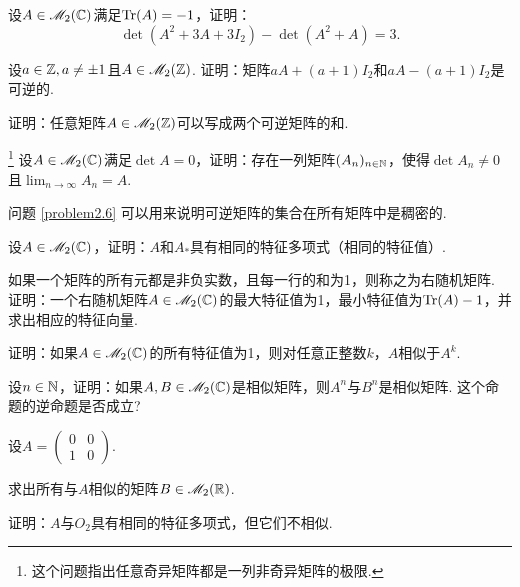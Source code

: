 \begin{problem}
  设$A\in\mathscr M_2(\mathbb C)$满足$\operatorname{Tr}(A)=-1$，证明：
  \[
    \det (A^2 + 3A + 3I_2) - \det (A^2 + A) = 3.
  \]
\end{problem}

\begin{problem}
  设$a\in\mathbb Z,a\ne\pm1$且$A\in\mathscr M_2(\mathbb Z)$. 证明：矩阵$aA+(a+1)I_2$和$aA-(a+1)I_2$是可逆的.
\end{problem}

\begin{problem}
  证明：任意矩阵$A\in\mathscr M_2(\mathbb Z)$可以写成两个可逆矩阵的和.
\end{problem}

\begin{problem}
  \footnote{这个问题指出任意奇异矩阵都是一列非奇异矩阵的极限.} 设$A\in\mathscr M_2(\mathbb C)$满足$\det A=0$，证明：存在一列矩阵$(A_n)_{n\in\mathbb N}$，使得$\det A_n\ne0$且$\lim_{n\to\infty}A_n=A$.
\end{problem}

\begin{remark}[可逆矩阵的稠密性.]
  问题 \ref{problem2.6} 可以用来说明可逆矩阵的集合在所有矩阵中是稠密的.
\end{remark}

\begin{problem}
  设$A\in\mathscr M_2(\mathbb C)$，证明：$A$和$A_\ast$具有相同的特征多项式（相同的特征值）.
\end{problem}

\begin{problem}
  如果一个矩阵的所有元都是非负实数，且每一行的和为1，则称之为{\kaishu 右随机矩阵}. 证明：一个右随机矩阵$A\in\mathscr M_2(\mathbb C)$的最大特征值为1，最小特征值为$\operatorname{Tr}(A)-1$，并求出相应的特征向量.
\end{problem}

\begin{problem}
  证明：如果$A\in\mathscr M_2(\mathbb C)$的所有特征值为1，则对任意正整数$k$，$A$相似于$A^k$.
\end{problem}

\begin{problem}
  设$n\in\mathbb N$，证明：如果$A,B\in\mathscr M_2(\mathbb C)$是相似矩阵，则$A^n$与$B^n$是相似矩阵. 这个命题的逆命题是否成立?
\end{problem}

\begin{problem}
  设$A=\begin{pmatrix}
    0 & 0 \\ 1 & 0
  \end{pmatrix}$.
  \begin{enum}
    \item 求出所有与$A$相似的矩阵$B\in\mathscr M_2(\mathbb R)$.
    \item 证明：$A$与$O_2$具有相同的特征多项式，但它们不相似.
  \end{enum}
\end{problem}

